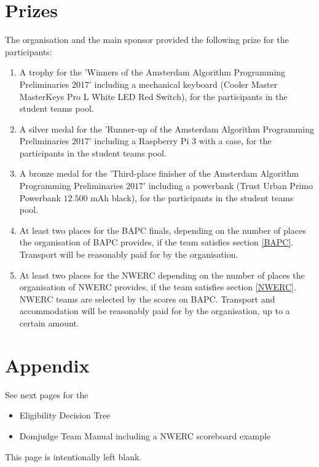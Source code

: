 \documentclass[11pt]{report}
\begin{document}
\chapter{Prizes}
The organisation and the main sponsor provided the following prize for the participants: %
\begin{enumerate}[label=\bfseries 5.\arabic*]
\item A trophy for the 'Winners of the Amsterdam Algorithm Programming Preliminaries $2017$' including a mechanical keyboard (Cooler Master MasterKeys Pro L White LED Red Switch), for the participants in the student teams pool.
\item A silver medal for the 'Runner-up of the Amsterdam Algorithm Programming Preliminaries $2017$' including a Raspberry Pi $3$ with a case, for the participants in the student teams pool.
\item A bronze medal for the 'Third-place finisher of the Amsterdam Algorithm Programming Preliminaries $2017$' including a powerbank (Trust Urban Primo Powerbank $12.500$ mAh black), for the participants in the student teams pool.
\item At least two places for the BAPC finals, depending on the number of places the organisation of BAPC provides, if the team satisfies section \ref{BAPC}. Transport will be reasonably paid for by the organisation.
\item At least two places for the NWERC depending on the number of places the organisation of NWERC provides, if the team satisfies section \ref{NWERC}. NWERC teams are selected by the scores on BAPC. Transport and accommodation will be reasonably paid for by the organisation, up to a certain amount. 
\end{enumerate}

\chapter{Appendix}
See next pages for the
\begin{itemize}
\item Eligibility Decision Tree
\item Domjudge Team Manual including a NWERC scoreboard example
\end{itemize}
\clearpage



\begin{center}
\vspace*{\fill}
This page is intentionally left blank.
\vspace*{\fill}
\end{center}
\clearpage


\end{document}
